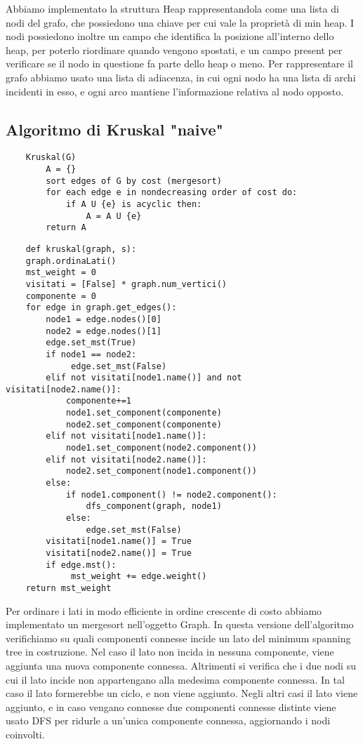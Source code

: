 Abbiamo implementato la struttura Heap rappresentandola come una lista di nodi del grafo, che possiedono una chiave per cui vale la proprietà di min heap.
I nodi possiedono inoltre un campo che identifica la posizione all'interno dello heap, per poterlo riordinare quando vengono spostati, e un campo present per verificare se il nodo in questione fa parte dello heap o meno.
Per rappresentare il grafo abbiamo usato una lista di adiacenza, in cui ogni nodo ha una lista di archi incidenti in esso, e ogni arco mantiene l'informazione relativa al nodo opposto.

\clearpage

\subsection{Algoritmo di Kruskal "naive"\label{sec:naive}}
\begin{verbatim}
    Kruskal(G)
        A = {}
        sort edges of G by cost (mergesort)
        for each edge e in nondecreasing order of cost do:
            if A U {e} is acyclic then:
                A = A U {e}
        return A
\end{verbatim}    

\begin{verbatim}
    def kruskal(graph, s):
    graph.ordinaLati()
    mst_weight = 0
    visitati = [False] * graph.num_vertici()
    componente = 0
    for edge in graph.get_edges(): 
        node1 = edge.nodes()[0]
        node2 = edge.nodes()[1]
        edge.set_mst(True)
        if node1 == node2:
             edge.set_mst(False)
        elif not visitati[node1.name()] and not visitati[node2.name()]:
            componente+=1
            node1.set_component(componente)
            node2.set_component(componente)
        elif not visitati[node1.name()]:
            node1.set_component(node2.component())
        elif not visitati[node2.name()]:
            node2.set_component(node1.component())
        else:
            if node1.component() != node2.component():
                dfs_component(graph, node1)
            else:
                edge.set_mst(False)
        visitati[node1.name()] = True
        visitati[node2.name()] = True        
        if edge.mst():
             mst_weight += edge.weight()          
    return mst_weight
\end{verbatim}

Per ordinare i lati in modo efficiente in ordine crescente di costo abbiamo implementato un mergesort nell'oggetto Graph.
In questa versione dell'algoritmo verifichiamo su quali componenti connesse incide un lato del minimum spanning tree in costruzione.
Nel caso il lato non incida in nessuna componente, viene aggiunta una nuova componente connessa.
Altrimenti si verifica che i due nodi su cui il lato incide non appartengano alla medesima componente connessa. In tal caso il lato formerebbe un ciclo, e non viene aggiunto.
Negli altri casi il lato viene aggiunto, e in caso vengano connesse due componenti connesse distinte viene usato DFS per ridurle a un'unica componente connessa, aggiornando i nodi coinvolti.

